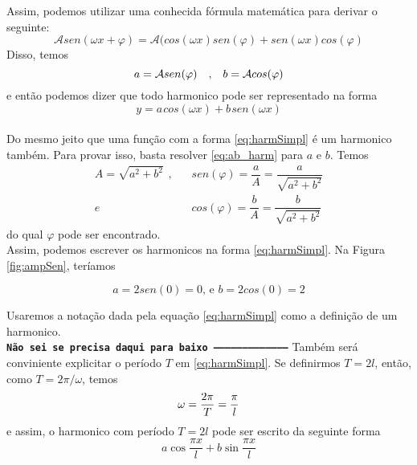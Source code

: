 Assim, podemos utilizar uma conhecida fórmula matemática para derivar
o seguinte:\\
\begin{equation}
    \mathcal{A}sen(\omega x + \varphi) = \mathcal{A}(cos(\omega x)sen(\varphi) + sen(\omega x)cos(\varphi)
\end{equation}
Disso, temos\\
\begin{equation}
    a = \mathcal{A}sen(\varphi)\text{\hspace{10pt},\hspace{10pt}}b = \mathcal{A}cos(\varphi)
\label{eq:ab_harm}
\end{equation}
e então podemos dizer que todo harmonico pode ser representado na forma
\begin{equation}
    y = a \hspace{1pt}cos(\omega x) + b\hspace{1pt}sen(\omega x)
\label{eq:harmSimpl}
\end{equation}
\\
Do mesmo jeito que uma função com a forma \ref{eq:harmSimpl} é um harmonico também. 
Para provar isso, basta resolver \ref{eq:ab_harm} para $a$ e $b$. Temos
\begin{equation}
    \begin{split}
        A = \sqrt{a^2 + b^2}\hspace{5pt},\hspace{10pt} &sen(\varphi) = \dfrac{a}{A} = \dfrac{a}{\sqrt{a^2 + b^2}}\\
        e\hspace{10pt} & cos(\varphi) = \dfrac{b}{A} = \dfrac{b}{\sqrt{a^2 + b^2}}
    \end{split}
\end{equation} 
do qual $\varphi$ pode ser encontrado.\\

Assim, podemos escrever os harmonicos na forma \ref{eq:harmSimpl}. Na Figura \ref{fig:ampSen},
teríamos

\begin{equation}
    a = 2sen(0) = 0\text{, e } b = 2cos(0) = 2
\end{equation}

Usaremos a notação dada pela equação \ref{eq:harmSimpl} como a definição de um harmonico.\\


\texttt{\textbf{Não sei se precisa daqui para baixo --------------------------------------}}
Também será conviniente explicitar o período $T$ em \ref{eq:harmSimpl}. Se definirmos
$T = 2l$, então, como $T = 2\pi/\omega$, temos
\begin{equation}
    \notag
    \omega = \dfrac{2\pi}{T}=\dfrac{\pi}{l}
\end{equation}
e assim, o harmonico com período $T=2l$ pode ser escrito da seguinte forma\\
\begin{equation}
    a\cos{\dfrac{\pi x}{l}} + b\sin{\dfrac{\pi x}{l}}
\end{equation}